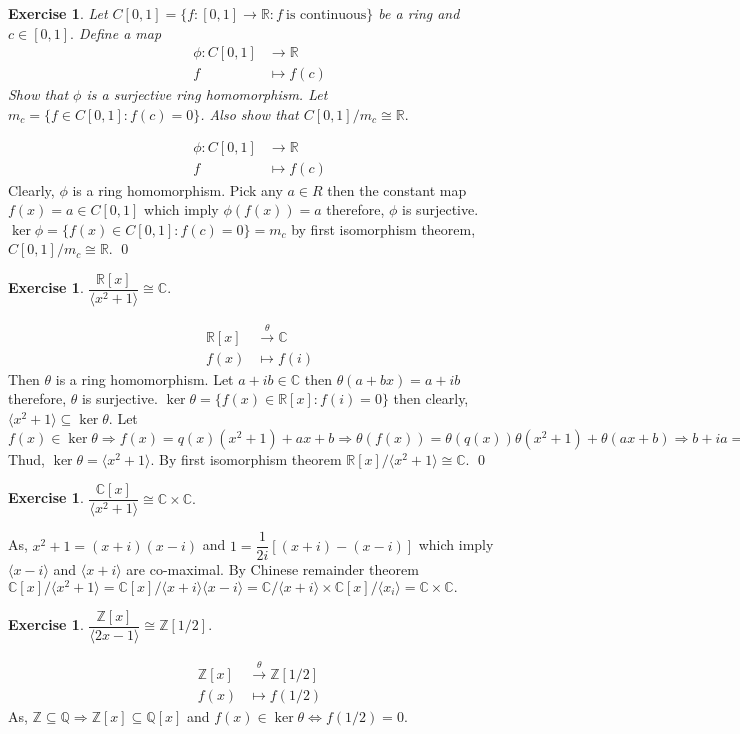 \documentclass[11pt]{amsart}
\newtheorem{ex}[theorem]{Exercise}
\newcommand{\QQ}{\mathbb Q}
\newcommand{\ZZ}{\mathbb Z}
\newcommand{\CC}{\mathbb C}
\newcommand{\RR}{\mathbb R}
\newcommand{\gen}[1]{\langle#1\rangle}
\begin{document}
\begin{ex}
Let $C[0,1]=\{f:[0,1]\to {\RR}:f~\text{is continuous}\}$ be a ring and $c\in [0,1].$ Define a map \begin{align*}
\phi:C[0,1]&\to {\RR}\\
f\quad&\mapsto f(c)
\end{align*}
Show that $\phi$ is a surjective ring homomorphism. Let $m_c=\{f\in C[0,1]:f(c)=0\}$. Also show that $C[0,1]/m_c\cong {\RR}.$ 
\end{ex}
\proof \begin{align*}
\phi:C[0,1]&\to {\RR}\\
f\quad&\mapsto f(c)
\end{align*} Clearly, $\phi$ is a ring homomorphism. Pick any $a\in R$ then the constant map $f(x)=a \in C[0,1]$ which imply $\phi(f(x))=a$ therefore, $\phi$ is surjective. $\ker \phi=\{f(x)\in C[0,1]:f(c)=0\}=m_c$ by first isomorphism theorem, $C[0,1]/m_c\cong {\RR}.$ \qed

\begin{ex}
$\dfrac{{\RR}[x]}{\langle x^2+1\rangle}\cong {\CC}.$
\end{ex}
\proof  \begin{align*}
{\RR}[x]&\stackrel{\theta}{\longrightarrow} {\CC}\\
f(x)&\mapsto f(i)
\end{align*}
Then $\theta$ is a ring homomorphism. Let $a+ib\in {\CC}$ then $ \theta(a+bx)=a+ib$ therefore, $\theta$ is surjective. $\ker \theta=\{f(x)\in {\RR}[x]:f(i)=0\}$ then clearly, $\gen{x^2+1}\subseteq \ker \theta.$ Let $f(x)\in \ker \theta \Rightarrow f(x)=q(x)(x^2+1)+ax+b \Rightarrow \theta(f(x))=\theta(q(x))\theta(x^2+1)+\theta(ax+b) \Rightarrow b+ia=0 \Rightarrow \ker \theta \subseteq \gen{x^2+1}.$ Thud, $\ker \theta=\gen{x^2+1}.$ By first isomorphism theorem ${\RR}[x]/\gen{x^2+1}\cong {\CC}.$ \qed



\begin{ex}
$\dfrac{{\CC}[x]}{\langle x^2+1\rangle}\cong {\CC}\times {\CC}.$
\end{ex}
\proof As, $x^2+1=(x+i)(x-i)$ and $1=\dfrac{1}{2i}[(x+i)-(x-i)]$ which imply $\gen{x-i}$ and $\gen{x+i}$ are co-maximal. By Chinese remainder theorem ${\CC}[x]/\gen{x^2+1}={\CC}[x]/\gen{x+i}\gen{x-i}={\CC}/\gen{x+i}\times {\CC}[x]/\gen{x_i}={\CC}\times {\CC}.$
\begin{ex}
$\dfrac{{\ZZ}[x]}{\langle 2x-1\rangle}\cong {\ZZ}\left[1/2\right].$
\end{ex}
\proof \begin{align*}
{\ZZ}[x]&\stackrel{\theta}{\longrightarrow} {\ZZ}[1/2]\\
f(x)&\mapsto f(1/2)
\end{align*}
As, ${\ZZ}\subseteq {\QQ} \Rightarrow {\ZZ}[x]\subseteq {\QQ}[x]$ and $f(x)\in \ker \theta \Leftrightarrow f(1/2)=0.$
\end{document}
